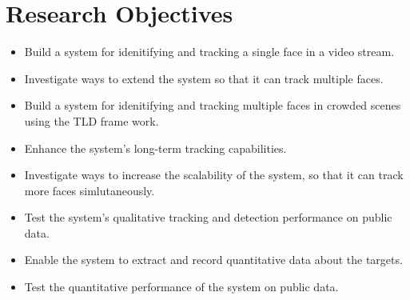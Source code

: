 \section{Research Objectives}
\begin{itemize}
  \item
    Build a system for idenitifying and tracking a single face in a video stream.
  \item
    Investigate ways to extend the system so that it can track multiple faces.
  \item
    Build a system for idenitifying and tracking multiple faces in crowded scenes using the TLD frame work.
  \item
    Enhance the system's long-term tracking capabilities.
  \item
    Investigate ways to increase the scalability of the system, so that it can track more faces simlutaneously.
  \item
    Test the system's qualitative tracking and detection performance on public data.
  \item
    Enable the system to extract and record quantitative data about the targets.
  \item
    Test the quantitative performance of the system on public data.
\end{itemize}
